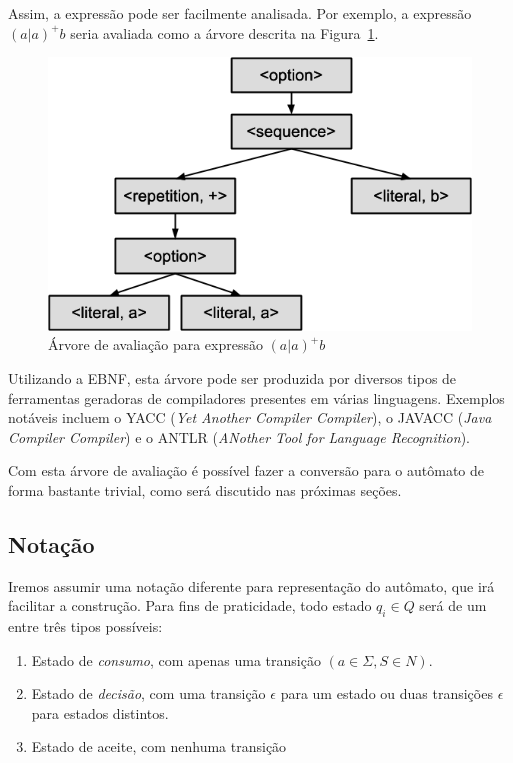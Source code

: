\documentclass[a4paper,12pt,oneside,onecolumn]{uerj}
\begin{document}
Assim, a expressão pode ser facilmente analisada. Por exemplo, a expressão $(a|a)^+b$ seria avaliada como a árvore descrita na Figura~\ref{fig:aab_parse_tree}.

\begin{figure}[!htbp]
  \centering
  \includegraphics[scale=0.5]{figures/aab_parse_tree.png}
  \caption{Árvore de avaliação para expressão $(a|a)^+b$}
  \label{fig:aab_parse_tree}
\end{figure}

Utilizando a EBNF, esta árvore pode ser produzida por diversos tipos de ferramentas geradoras de compiladores presentes em várias linguagens. Exemplos notáveis incluem o YACC (\emph{Yet Another Compiler Compiler}), o JAVACC (\emph{Java Compiler Compiler}) e o ANTLR (\emph{ANother Tool for Language Recognition}).

Com esta árvore de avaliação é possível fazer a conversão para o autômato de forma bastante trivial, como será discutido nas próximas seções.

\subsection{Notação}
\label{sec:Notacao}

Iremos assumir uma notação diferente para representação do autômato, que irá facilitar a construção. Para fins de praticidade, todo estado $q_i \in Q$ será de um entre três tipos possíveis:

\begin{enumerate}
    \item Estado de \emph{consumo},  com apenas uma transição $(a \in \Sigma, S \in N)$.
    \item Estado de \emph{decisão}, com uma transição $\epsilon$ para um estado ou duas transições $\epsilon$ para estados distintos.
    \item Estado de aceite, com nenhuma transição
\end{enumerate}
\end{document}

